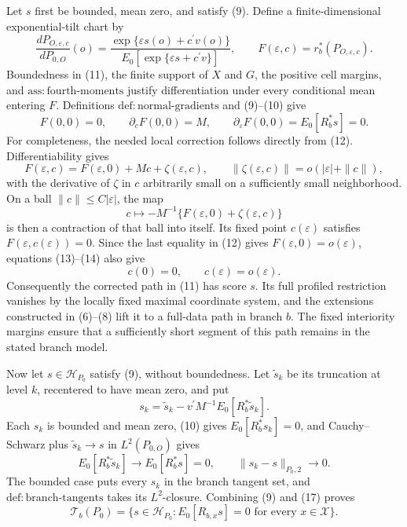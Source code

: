 Let \(s\) first be bounded, mean zero, and satisfy (9).  Define a finite-dimensional exponential-tilt chart by
\[
 \frac{dP_{O,\varepsilon,c}}{dP_{0,O}}(o)
 =\frac{\exp\{\varepsilon s(o)+c^{\prime}v(o)\}}
 {E_0[\exp\{\varepsilon s+c^{\prime}v\}]},
 \qquad
 F(\varepsilon,c)=r_b^{\ast}(P_{O,\varepsilon,c}).
 \tag{11}
\]
Boundedness in (11), the finite support of \(X\) and \(G\), the positive cell margins, and \(\mathrm{ass{:}fourth\text{-}moments}\) justify differentiation under every conditional mean entering \(F\).  Definitions \(\mathrm{def{:}normal\text{-}gradients}\) and (9)--(10) give
\[
 F(0,0)=0,
 \qquad
 \partial_cF(0,0)=M,
 \qquad
 \partial_\varepsilon F(0,0)=E_0[R_b^{\ast}s]=0.
 \tag{12}
\]
For completeness, the needed local correction follows directly from (12).  Differentiability gives
\[
 F(\varepsilon,c)=F(\varepsilon,0)+Mc+\zeta(\varepsilon,c),
 \qquad
 \|\zeta(\varepsilon,c)\|=o(|\varepsilon|+\|c\|),
 \tag{13}
\]
with the derivative of \(\zeta\) in \(c\) arbitrarily small on a sufficiently small neighborhood.  On a ball \(\|c\|\le C|\varepsilon|\), the map
\[
 c\longmapsto-M^{-1}\{F(\varepsilon,0)+\zeta(\varepsilon,c)\}
 \tag{14}
\]
is then a contraction of that ball into itself.  Its fixed point \(c(\varepsilon)\) satisfies \(F(\varepsilon,c(\varepsilon))=0\).  Since the last equality in (12) gives \(F(\varepsilon,0)=o(\varepsilon)\), equations (13)--(14) also give
\[
 c(0)=0,
 \qquad
 c(\varepsilon)=o(\varepsilon).
 \tag{15}
\]
Consequently the corrected path in (11) has score \(s\).  Its full profiled restriction vanishes by the locally fixed maximal coordinate system, and the extensions constructed in (6)--(8) lift it to a full-data path in branch \(b\).  The fixed interiority margins ensure that a sufficiently short segment of this path remains in the stated branch model.

Now let \(s\in\mathcal H_{P_0}\) satisfy (9), without boundedness.  Let \(\widetilde s_k\) be its truncation at level \(k\), recentered to have mean zero, and put
\[
 s_k=\widetilde s_k-v^{\prime}M^{-1}E_0[R_b^{\ast}\widetilde s_k].
 \tag{16}
\]
Each \(s_k\) is bounded and mean zero, (10) gives \(E_0[R_b^{\ast}s_k]=0\), and Cauchy--Schwarz plus \(\widetilde s_k\to s\) in \(L^2(P_{0,O})\) gives
\[
 E_0[R_b^{\ast}\widetilde s_k]\longrightarrow E_0[R_b^{\ast}s]=0,
 \qquad
 \|s_k-s\|_{P_0,2}\longrightarrow0.
 \tag{17}
\]
The bounded case puts every \(s_k\) in the branch tangent set, and \(\mathrm{def{:}branch\text{-}tangents}\) takes its \(L^2\)-closure.  Combining (9) and (17) proves
\[
 \mathcal T_b(P_0)
 =\{s\in\mathcal H_{P_0}:E_0[R_{b,x}s]=0
       \text{ for every }x\in\mathcal X\}.
 \tag{18}
\]

